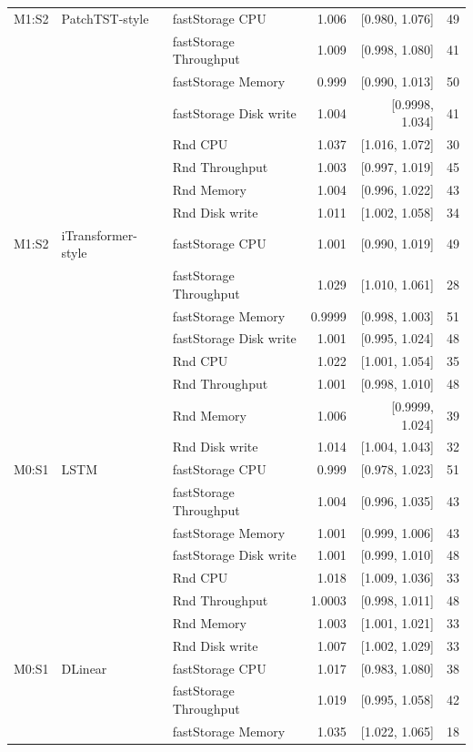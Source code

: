 \documentclass[a4paper,11pt]{article}
\begin{document}
\begin{longtable}{@{}lllrrr@{}}
M1:S2 & PatchTST-style & fastStorage CPU & 1.006 & [0.980, 1.076] & 49 \\
 &  & fastStorage Throughput & 1.009 & [0.998, 1.080] & 41 \\
 &  & fastStorage Memory & 0.999 & [0.990, 1.013] & 50 \\
 &  & fastStorage Disk write & 1.004 & [0.9998, 1.034] & 41 \\
 &  & Rnd CPU & 1.037 & [1.016, 1.072] & 30 \\
 &  & Rnd Throughput & 1.003 & [0.997, 1.019] & 45 \\
 &  & Rnd Memory & 1.004 & [0.996, 1.022] & 43 \\
 &  & Rnd Disk write & 1.011 & [1.002, 1.058] & 34 \\
\addlinespace
M1:S2 & iTransformer-style & fastStorage CPU & 1.001 & [0.990, 1.019] & 49 \\
 &  & fastStorage Throughput & 1.029 & [1.010, 1.061] & 28 \\
 &  & fastStorage Memory & 0.9999 & [0.998, 1.003] & 51 \\
 &  & fastStorage Disk write & 1.001 & [0.995, 1.024] & 48 \\
 &  & Rnd CPU & 1.022 & [1.001, 1.054] & 35 \\
 &  & Rnd Throughput & 1.001 & [0.998, 1.010] & 48 \\
 &  & Rnd Memory & 1.006 & [0.9999, 1.024] & 39 \\
 &  & Rnd Disk write & 1.014 & [1.004, 1.043] & 32 \\
\addlinespace
M0:S1 & LSTM & fastStorage CPU & 0.999 & [0.978, 1.023] & 51 \\
 &  & fastStorage Throughput & 1.004 & [0.996, 1.035] & 43 \\
 &  & fastStorage Memory & 1.001 & [0.999, 1.006] & 43 \\
 &  & fastStorage Disk write & 1.001 & [0.999, 1.010] & 48 \\
 &  & Rnd CPU & 1.018 & [1.009, 1.036] & 33 \\
 &  & Rnd Throughput & 1.0003 & [0.998, 1.011] & 48 \\
 &  & Rnd Memory & 1.003 & [1.001, 1.021] & 33 \\
 &  & Rnd Disk write & 1.007 & [1.002, 1.029] & 33 \\
\addlinespace
M0:S1 & DLinear & fastStorage CPU & 1.017 & [0.983, 1.080] & 38 \\
 &  & fastStorage Throughput & 1.019 & [0.995, 1.058] & 42 \\
 &  & fastStorage Memory & 1.035 & [1.022, 1.065] & 18 \\

\end{longtable}
\end{document}
